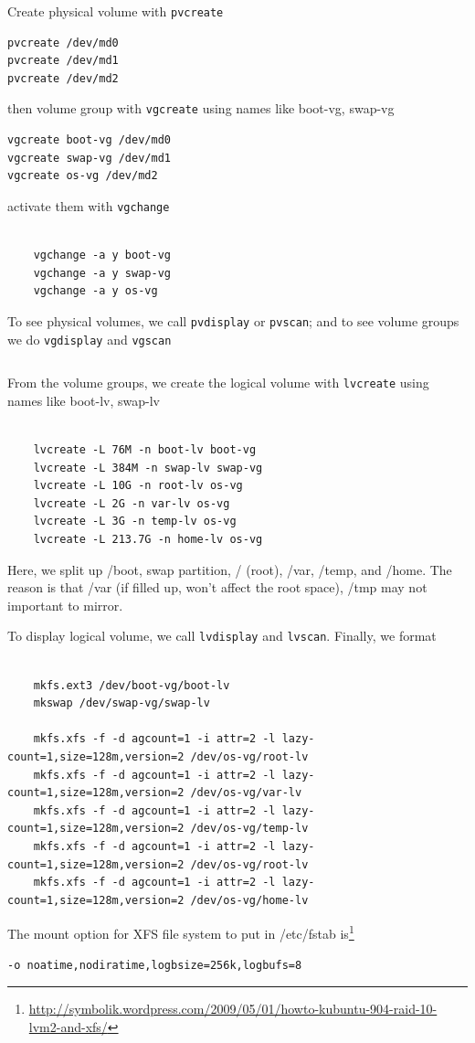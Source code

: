 Create physical volume with \verb!pvcreate!
\begin{verbatim}
pvcreate /dev/md0
pvcreate /dev/md1
pvcreate /dev/md2
\end{verbatim}
then volume group with \verb!vgcreate! using names like boot-vg, swap-vg
\begin{verbatim}
vgcreate boot-vg /dev/md0
vgcreate swap-vg /dev/md1
vgcreate os-vg /dev/md2
\end{verbatim}
activate them with \verb!vgchange!
\begin{verbatim}

    vgchange -a y boot-vg
    vgchange -a y swap-vg
    vgchange -a y os-vg
\end{verbatim}
To see physical volumes, we call \verb!pvdisplay! or \verb!pvscan!; and to see
volume groups we do \verb!vgdisplay! and \verb!vgscan!
\begin{verbatim}

\end{verbatim}
From the volume groups, we create the logical volume with \verb!lvcreate! using
names like boot-lv, swap-lv
\begin{verbatim}

    lvcreate -L 76M -n boot-lv boot-vg
    lvcreate -L 384M -n swap-lv swap-vg
    lvcreate -L 10G -n root-lv os-vg
    lvcreate -L 2G -n var-lv os-vg
    lvcreate -L 3G -n temp-lv os-vg
    lvcreate -L 213.7G -n home-lv os-vg
\end{verbatim}
Here, we split up /boot, swap partition, / (root), /var, /temp, and /home. The
reason is that /var (if filled up, won't affect the root space), /tmp may not
important to mirror. 

To display logical volume, we call \verb!lvdisplay! and \verb!lvscan!. Finally,
we format 
\begin{verbatim}

    mkfs.ext3 /dev/boot-vg/boot-lv
    mkswap /dev/swap-vg/swap-lv

    mkfs.xfs -f -d agcount=1 -i attr=2 -l lazy-count=1,size=128m,version=2 /dev/os-vg/root-lv
    mkfs.xfs -f -d agcount=1 -i attr=2 -l lazy-count=1,size=128m,version=2 /dev/os-vg/var-lv
    mkfs.xfs -f -d agcount=1 -i attr=2 -l lazy-count=1,size=128m,version=2 /dev/os-vg/temp-lv
    mkfs.xfs -f -d agcount=1 -i attr=2 -l lazy-count=1,size=128m,version=2 /dev/os-vg/root-lv
    mkfs.xfs -f -d agcount=1 -i attr=2 -l lazy-count=1,size=128m,version=2 /dev/os-vg/home-lv
\end{verbatim}

The mount option for XFS file system to put in /etc/fstab
is\footnote{\url{http://symbolik.wordpress.com/2009/05/01/howto-kubuntu-904-raid-10-lvm2-and-xfs/}}
\begin{verbatim}
-o noatime,nodiratime,logbsize=256k,logbufs=8
\end{verbatim}


